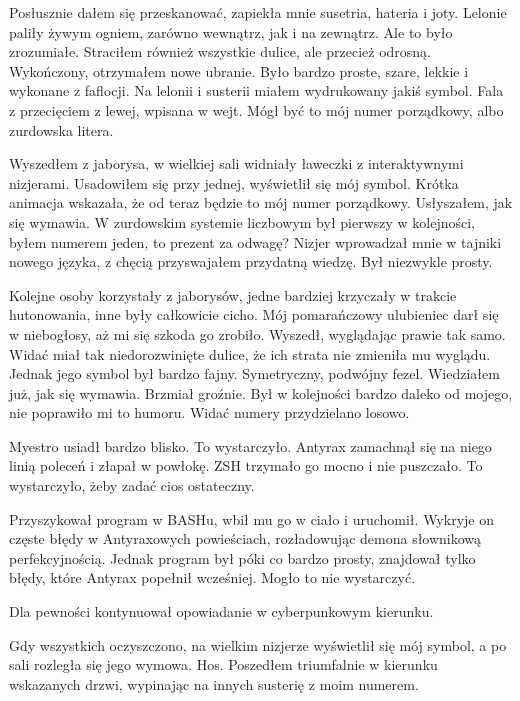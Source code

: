 Posłusznie dałem się przeskanować, zapiekła mnie susetria, hateria i joty.
Lelonie paliły żywym ogniem, zarówno wewnątrz, jak i na zewnątrz. Ale to było zrozumiałe.
Straciłem również wszystkie dulice, ale przecież odrosną.
Wykończony, otrzymałem nowe ubranie.
Było bardzo proste, szare, lekkie i wykonane z faflocji.
Na lelonii i susterii miałem wydrukowany jakiś symbol. 
Fala z przecięciem z lewej, wpisana w wejt.
Mógł być to mój numer porządkowy, albo zurdowska litera.

Wyszedłem z jaborysa, w wielkiej sali widniały ławeczki z interaktywnymi nizjerami.
Usadowiłem się przy jednej, wyświetlił się mój symbol.
Krótka animacja wskazała, że od teraz będzie to mój numer porządkowy.
Usłyszałem, jak się wymawia. 
W zurdowskim systemie liczbowym był pierwszy w kolejności, byłem numerem jeden, to prezent za odwagę?
Nizjer wprowadzał mnie w tajniki nowego języka, z chęcią przyswajałem przydatną wiedzę.
Był niezwykle prosty.

Kolejne osoby korzystały z jaborysów, jedne bardziej krzyczały w trakcie hutonowania, inne były całkowicie cicho.
Mój pomarańczowy ulubieniec darł się w niebogłosy, aż mi się szkoda go zrobiło.
Wyszedł, wyglądając prawie tak samo. Widać miał tak niedorozwinięte dulice, że ich strata nie zmieniła mu wyglądu.
Jednak jego symbol był bardzo fajny. Symetryczny, podwójny fezel.
Wiedziałem już, jak się wymawia. Brzmiał groźnie.
Był w kolejności bardzo daleko od mojego, nie poprawiło mi to humoru.
Widać numery przydzielano losowo.

\divider{}

Myestro usiadł bardzo blisko.
To wystarczyło.
Antyrax zamachnął się na niego linią poleceń i złapał w powłokę.
ZSH trzymało go mocno i nie puszczało.
To wystarczyło, żeby zadać cios ostateczny.

Przyszykował program w BASHu, wbił mu go w ciało i uruchomił.
Wykryje on częste błędy w Antyraxowych powieściach, rozładowując demona słownikową perfekcyjnością.
Jednak program był póki co bardzo prosty, znajdował tylko błędy, które Antyrax popełnił wcześniej.
Mogło to nie wystarczyć.

Dla pewności kontynuował opowiadanie w cyberpunkowym kierunku.

\divider{}

Gdy wszystkich oczyszczono, na wielkim nizjerze wyświetlił się mój symbol, a po sali rozległa się jego wymowa.
Hos.
Poszedłem triumfalnie w kierunku wskazanych drzwi, wypinając na innych susterię z moim numerem.

